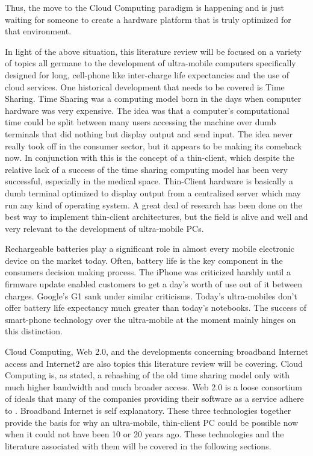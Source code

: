 Thus, the move to the Cloud Computing paradigm is happening and is just waiting
for someone to create a hardware platform that is truly optimized for that
environment.

In light of the above situation, this literature review will be focused on a
variety of topics all germane to the development of ultra-mobile computers
specifically designed for long, cell-phone like inter-charge life expectancies
and the use of cloud services.  One historical development that needs to be
covered is Time Sharing.  Time Sharing was a computing model born in the days
when computer hardware was very expensive.  The idea was that a computer's
computational time could be split between many users accessing the machine over
dumb terminals that did nothing but display output and send input.  The idea
never really took off in the consumer sector, but it appears to be making its
comeback now.  In conjunction with this is the concept of a thin-client, which
despite the relative lack of a success of the time sharing computing model has
been very successful, especially in the medical space.  Thin-Client hardware is
basically a dumb terminal optimized to display output from a centralized server
which may run any kind of operating system.  A great deal of research has been
done on the best way to implement thin-client architectures, but the field is
alive and well and very relevant to the development of ultra-mobile PCs.

Rechargeable batteries play a significant role in almost every mobile electronic
device on the market today.  Often, battery life is the key component in the
consumers decision making process.  The iPhone was criticized harshly until a
firmware update enabled customers to get a day's worth of use out of it between
charges.  Google's G1 sank under similar criticisms.  Today's ultra-mobiles
don't offer battery life expectancy much greater than today's notebooks.  The
success of smart-phone technology over the ultra-mobile at the moment mainly
hinges on this distinction.

Cloud Computing, Web 2.0, and the developments concerning broadband Internet
access and Internet2 are also topics this literature review will be covering.
Cloud Computing is, as stated, a rehashing of the old time sharing model only
with much higher bandwidth and much broader access.  Web 2.0 is a loose
consortium of ideals that many of the companies providing their software as a
service adhere to \citep{oreilly2007}.  Broadband Internet is self explanatory.
These three technologies together provide the basis for why an ultra-mobile,
thin-client PC could be possible now when it could not have been 10 or 20 years
ago.  These technologies and the literature associated with them will be covered
in the following sections.

